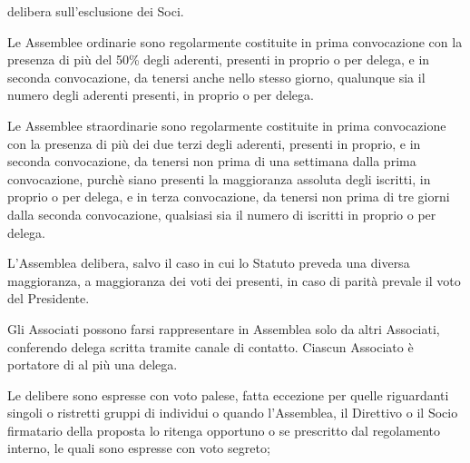 \documentclass[legalpaper, 11pt]{exam}
\let\tempone\enumerate
\let\temptwo\endenumerate
\renewenvironment{enumerate}{\tempone\addtolength{\itemsep}{-0.45\baselineskip}}{\temptwo}
\begin{document}
{\begin{enumerate}
\begin{enumerate}
  \item delibera sull’esclusione dei Soci.
 \end{enumerate}
 \item Le Assemblee ordinarie sono regolarmente costituite in prima convocazione con la presenza di più del 50\% degli aderenti, presenti in proprio o per delega, e in seconda convocazione, da tenersi anche nello stesso giorno, qualunque sia il numero degli aderenti presenti, in proprio o per delega.
  \item Le Assemblee straordinarie sono regolarmente costituite in prima convocazione con la presenza di più dei due terzi degli aderenti, presenti in proprio, e in seconda convocazione, da tenersi non prima di una settimana dalla prima convocazione, purchè siano presenti la maggioranza assoluta degli iscritti, in proprio o per delega, e in terza convocazione, da tenersi non prima di tre giorni dalla seconda convocazione, qualsiasi sia il numero di iscritti in proprio o per delega.
 \item L’Assemblea delibera, salvo il caso in cui lo Statuto preveda una diversa maggioranza, a maggioranza dei voti dei presenti, in caso di parità prevale il voto del Presidente. 
 \item Gli Associati possono farsi rappresentare in Assemblea solo da altri Associati, conferendo delega scritta tramite canale di contatto. Ciascun Associato è portatore di al più una delega.
 \item Le delibere sono espresse con voto palese, fatta eccezione per quelle riguardanti singoli o ristretti gruppi di individui o quando l’Assemblea, il Direttivo o il Socio firmatario della proposta lo ritenga opportuno o se prescritto dal regolamento interno, le quali sono espresse con voto segreto;
\end{enumerate}

}
\end{document}

